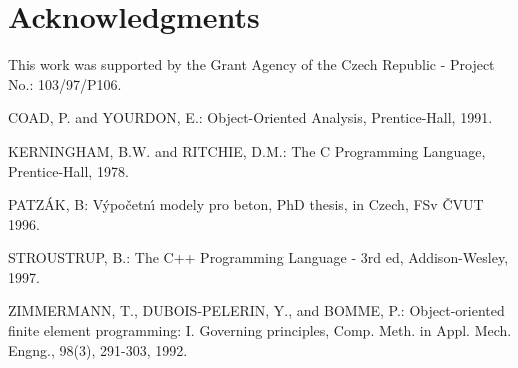 \documentclass[a4paper]{article}
\begin{document}
\section*{Acknowledgments}
This work was supported by the Grant Agency of the Czech Republic -
Project No.: 103/97/P106.

\begin{thebibliography}{9}

COAD, P. and YOURDON, E.: {Object-Oriented Analysis,} Prentice-Hall,  1991.

 KERNINGHAM, B.W. and RITCHIE, D.M.: {The C Programming
Language,} Prentice-Hall, 1978.

 PATZ\'{A}K, B: {V\'{y}po\v{c}etn\'{\i} modely pro beton,} PhD
thesis, in Czech, FSv \v{C}VUT 1996. 

 STROUSTRUP, B.: {The C++ Programming Language - 3rd ed,}
Addison-Wesley, 1997.

 ZIMMERMANN, T., DUBOIS-PELERIN, Y., and BOMME, P.: {Object-oriented finite element programming: I. Governing principles,} Comp. Meth. in Appl. Mech. Engng., 98(3), 291-303, 1992. 
\end{thebibliography}






\end{document}
